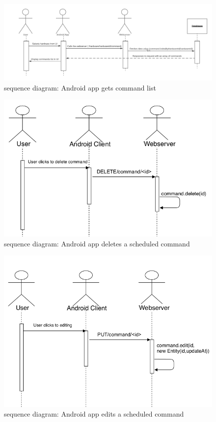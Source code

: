 \documentclass[12pt, oneside, a4paper]{book}
\begin{document}
				\begin{figure}[H]
					\caption{sequence diagram: Android app gets command list}
					\label{android_command_list}
					\includegraphics[width=\linewidth]{img/sequence_android_command_list.png}
				\end{figure}
				\begin{figure}[H]
					\caption{sequence diagram: Android app deletes a scheduled command}
					\label{android_del}
					\includegraphics[width=\linewidth]{img/sequence_android_delete.png}
				\end{figure}
				\begin{figure}[H]
					\caption{sequence diagram: Android app edits a scheduled command}
					\label{android_edit}
					\includegraphics[width=\linewidth]{img/sequence_android_edit.png}
				\end{figure}
\end{document}
